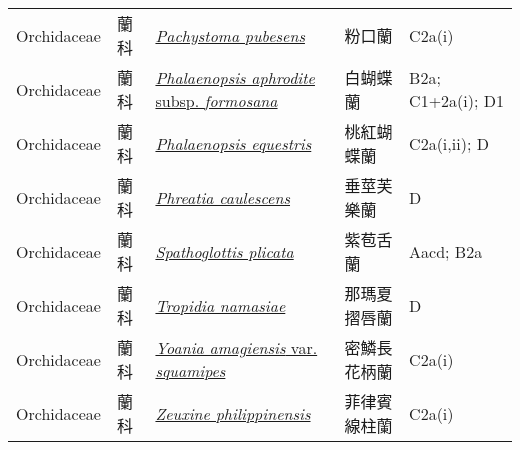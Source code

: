 {\begin{longtable}{L{2.5cm}L{2cm}L{5cm}L{2.5cm}L{3cm}}
    Orchidaceae & 蘭科 & \href{http://www.theplantlist.org/tpl1.1/search?q=Pachystoma+pubesens}{\textit{Pachystoma pubesens} } & 粉口蘭 & C2a(i)    \\
    Orchidaceae & 蘭科 & \href{http://www.theplantlist.org/tpl1.1/search?q=Phalaenopsis+aphrodite+subsp.+formosana}{\textit{Phalaenopsis aphrodite} subsp. \textit{formosana} } & 白蝴蝶蘭 & B2a; C1+2a(i); D1    \\
    Orchidaceae & 蘭科 & \href{http://www.theplantlist.org/tpl1.1/search?q=Phalaenopsis+equestris}{\textit{Phalaenopsis equestris} } & 桃紅蝴蝶蘭 & C2a(i,ii); D    \\
    Orchidaceae & 蘭科 & \href{http://www.theplantlist.org/tpl1.1/search?q=Phreatia+caulescens}{\textit{Phreatia caulescens} } & 垂莖芙樂蘭 & D    \\
    Orchidaceae & 蘭科 & \href{http://www.theplantlist.org/tpl1.1/search?q=Spathoglottis+plicata}{\textit{Spathoglottis plicata} } & 紫苞舌蘭 & Aacd; B2a    \\
    Orchidaceae & 蘭科 & \href{http://www.theplantlist.org/tpl1.1/search?q=Tropidia+namasiae}{\textit{Tropidia namasiae} } & 那瑪夏摺唇蘭 & D    \\
    Orchidaceae & 蘭科 & \href{http://www.theplantlist.org/tpl1.1/search?q=Yoania+amagiensis+var.+squamipes}{\textit{Yoania amagiensis} var. \textit{squamipes} } & 密鱗長花柄蘭 & C2a(i)    \\
    Orchidaceae & 蘭科 & \href{http://www.theplantlist.org/tpl1.1/search?q=Zeuxine+philippinensis}{\textit{Zeuxine philippinensis} } & 菲律賓線柱蘭 & C2a(i)    \\

\end{longtable}}
